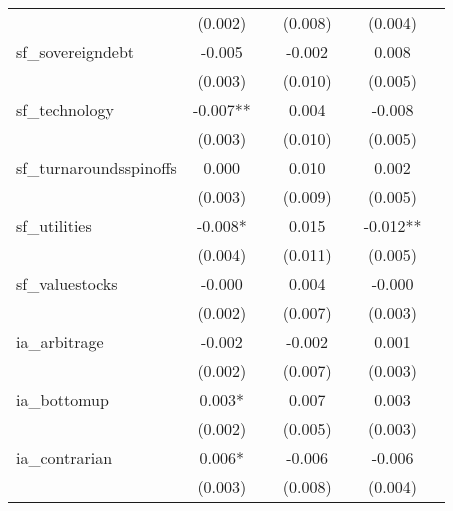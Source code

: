 {\begin{tabular}{l*{6}{c}}
            &     (0.002)   &               &     (0.008)   &               &     (0.004)   &               \\
[1em]
sf\_sovereigndebt&      -0.005   &               &      -0.002   &               &       0.008   &               \\
            &     (0.003)   &               &     (0.010)   &               &     (0.005)   &               \\
[1em]
sf\_technology&      -0.007** &               &       0.004   &               &      -0.008   &               \\
            &     (0.003)   &               &     (0.010)   &               &     (0.005)   &               \\
[1em]
sf\_turnaroundsspinoffs&       0.000   &               &       0.010   &               &       0.002   &               \\
            &     (0.003)   &               &     (0.009)   &               &     (0.005)   &               \\
[1em]
sf\_utilities&      -0.008*  &               &       0.015   &               &      -0.012** &               \\
            &     (0.004)   &               &     (0.011)   &               &     (0.005)   &               \\
[1em]
sf\_valuestocks&      -0.000   &               &       0.004   &               &      -0.000   &               \\
            &     (0.002)   &               &     (0.007)   &               &     (0.003)   &               \\
[1em]
ia\_arbitrage&      -0.002   &               &      -0.002   &               &       0.001   &               \\
            &     (0.002)   &               &     (0.007)   &               &     (0.003)   &               \\
[1em]
ia\_bottomup &       0.003*  &               &       0.007   &               &       0.003   &               \\
            &     (0.002)   &               &     (0.005)   &               &     (0.003)   &               \\
[1em]
ia\_contrarian&       0.006*  &               &      -0.006   &               &      -0.006   &               \\
            &     (0.003)   &               &     (0.008)   &               &     (0.004)   &               \\

\end{tabular}}
